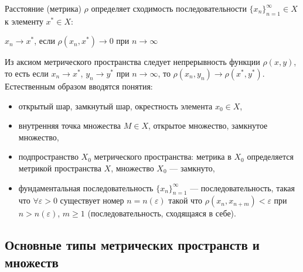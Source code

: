 \documentclass[12pt,a4paper,titlepage, oneside]{book}
\theoremstyle{definition}
\theoremstyle{plain}
\theoremstyle{remark}
\theoremstyle{remark}
\theoremstyle{remark}
\theoremstyle{plain}
\theoremstyle{plain}
\begin{document}
Расстояние (метрика) $\rho$ определяет сходимость последовательности $\lbrace x_n \rbrace_{n=1}^{\infty} \in X$ к элементу $x^{*} \in X$:

\begin{center}

$x_n\to x^*$, если $\rho(x_n, x^{*})\to 0$ при $n\to\infty$

\end{center}

Из аксиом метрического пространства следует непрерывность функции $\rho(x, y)$, то есть если $x_n\to x^{*}$, $y_n\to y^{*}$ при $n \to \infty$, то $\rho(x_n, y_n) \to \rho(x^*, y^*)$.\\

Естественным образом вводятся понятия:

\begin{itemize}

	\item  открытый шар, замкнутый шар, окрестность элемента $x_0\in X$,

	\item внутренняя точка множества $M \in X$, открытое множество, замкнутое множество,

	\item подпространство $X_0$ метрического пространства: метрика в $X_0$ определяется метрикой пространства $X$, множество $X_0$ --- замкнуто,

	\item фундаментальная последовательность $\lbrace x_n \rbrace_{n=1}^{\infty}$ --- последовательность, такая что $\forall \varepsilon > 0$ существует номер $n = n(\varepsilon)$ такой что $\rho(x_n, x_{n+m}) < \varepsilon$ при $n > n(\varepsilon)$, $m \geq 1$ (последовательность, сходящаяся в себе).

\end{itemize}

\subsection*{Основные типы метрических пространств и множеств}
\end{document}
